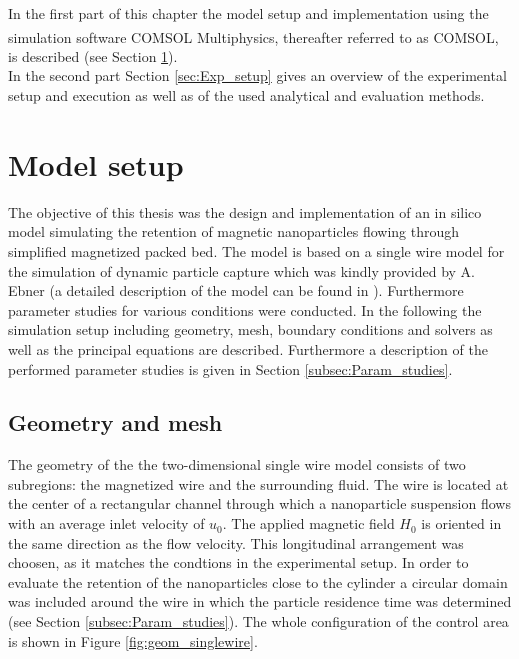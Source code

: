 In the first part of this chapter the model setup and implementation using the simulation software COMSOL Multiphysics\textsuperscript{\textregistered}, thereafter referred to as COMSOL, is described (see Section \ref{sec:Model_setup}).\\
In the second part Section \ref{sec:Exp_setup} gives an overview of the experimental setup and execution as well as of the used analytical and evaluation methods.  

\section{Model setup}
\label{sec:Model_setup}
The objective of this thesis was the design and implementation of an in silico model simulating the retention of magnetic nanoparticles flowing through simplified magnetized packed bed. The model is based on a single wire model for the simulation of dynamic particle capture which was kindly provided by A. Ebner (a detailed description of the model can be found in \cite{choomphon2017simulation}). Furthermore parameter studies for various conditions were conducted. In the following the simulation setup including geometry, mesh, boundary conditions and solvers as well as the principal equations are described. Furthermore a description of the performed parameter studies is given in Section \ref{subsec:Param_studies}.     

\subsection{Geometry and mesh}
\label{subsec:geom}
The geometry of the the two-dimensional single wire model consists of two subregions: the magnetized wire and the surrounding fluid. The wire is located at the center of a rectangular channel through which a nanoparticle suspension flows with an average inlet velocity of $u_{0}$. The applied magnetic field $H_{0}$ is oriented in the same direction as the flow velocity. This longitudinal arrangement was choosen, as it matches the condtions in the experimental setup. In order to evaluate the retention of the nanoparticles close to the cylinder a circular domain was included around the wire in which the particle residence time was determined (see Section \ref{subsec:Param_studies}). The whole configuration of the control area is shown in Figure \ref{fig:geom_singlewire}.

